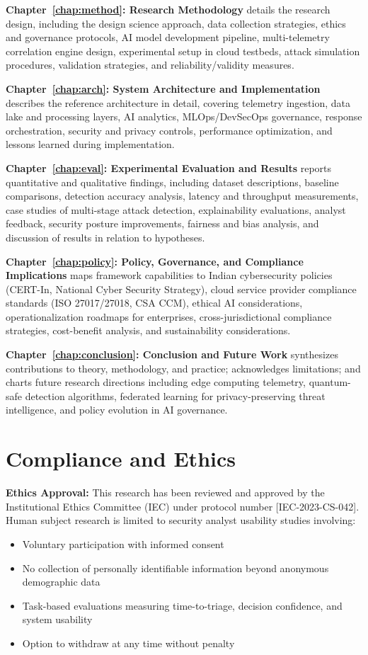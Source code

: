 \textbf{Chapter~\ref{chap:method}: Research Methodology} details the research design, including the design science approach, data collection strategies, ethics and governance protocols, AI model development pipeline, multi-telemetry correlation engine design, experimental setup in cloud testbeds, attack simulation procedures, validation strategies, and reliability/validity measures.

\textbf{Chapter~\ref{chap:arch}: System Architecture and Implementation} describes the reference architecture in detail, covering telemetry ingestion, data lake and processing layers, AI analytics, MLOps/DevSecOps governance, response orchestration, security and privacy controls, performance optimization, and lessons learned during implementation.

\textbf{Chapter~\ref{chap:eval}: Experimental Evaluation and Results} reports quantitative and qualitative findings, including dataset descriptions, baseline comparisons, detection accuracy analysis, latency and throughput measurements, case studies of multi-stage attack detection, explainability evaluations, analyst feedback, security posture improvements, fairness and bias analysis, and discussion of results in relation to hypotheses.

\textbf{Chapter~\ref{chap:policy}: Policy, Governance, and Compliance Implications} maps framework capabilities to Indian cybersecurity policies (CERT-In, National Cyber Security Strategy), cloud service provider compliance standards (ISO 27017/27018, CSA CCM), ethical AI considerations, operationalization roadmaps for enterprises, cross-jurisdictional compliance strategies, cost-benefit analysis, and sustainability considerations.

\textbf{Chapter~\ref{chap:conclusion}: Conclusion and Future Work} synthesizes contributions to theory, methodology, and practice; acknowledges limitations; and charts future research directions including edge computing telemetry, quantum-safe detection algorithms, federated learning for privacy-preserving threat intelligence, and policy evolution in AI governance.

\section{Compliance and Ethics}\label{sec:intro-compliance}
\textbf{Ethics Approval:} This research has been reviewed and approved by the Institutional Ethics Committee (IEC) under protocol number [IEC-2023-CS-042]. Human subject research is limited to security analyst usability studies involving:
\begin{itemize}
    \item Voluntary participation with informed consent
    \item No collection of personally identifiable information beyond anonymous demographic data
    \item Task-based evaluations measuring time-to-triage, decision confidence, and system usability
    \item Option to withdraw at any time without penalty
\end{itemize}


